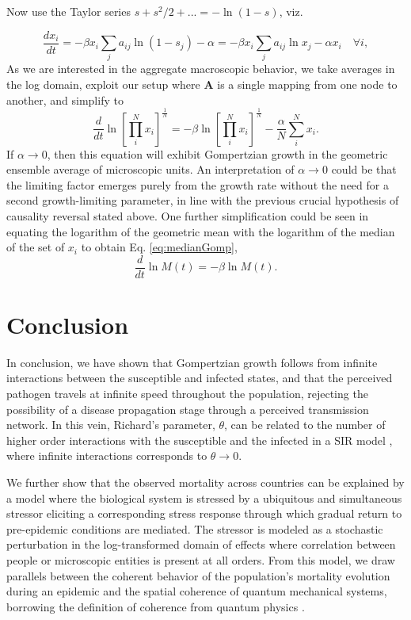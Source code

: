 \documentclass[review]{elsarticle}
\begin{document}
Now use the Taylor series $s+s^2/2+... = -\ln(1-s)$, viz.

\begin{equation}
\frac{d x_i}{dt} = -\beta x_i\sum_j{a_{ij}}\ln{(1 - s_j)} - \alpha = -\beta x_i\sum_j{a_{ij}}\ln{x_j} - \alpha x_i \quad \forall i,
\end{equation}
As we are interested in the aggregate macroscopic behavior, we take averages in the log domain, exploit our setup where $\mathbf{A}$ is a single mapping from one node to another, and simplify to
\begin{equation}
\frac{d}{{dt}} \ln\left[\prod_i^N{x_i}\right]^{\frac{1}{N}} = -\beta\ln\left[\prod_i^N{x_i}\right]^{\frac{1}{N}} - \frac{\alpha}{N}\sum_i^N x_i.
\end{equation}
If $\alpha\rightarrow 0$, then this equation will exhibit Gompertzian growth in the geometric ensemble average of microscopic units. 
An interpretation of $\alpha\rightarrow 0$ could be that the limiting factor emerges purely from the growth rate without the need for a second growth-limiting parameter, in line with the previous crucial hypothesis of causality reversal stated above. One further simplification could be seen in equating the logarithm of the geometric mean with the logarithm of the median of the set of $x_i$ to obtain Eq. \ref{eq:medianGomp},
\begin{equation}
\frac{d}{dt}\ln{M(t)} = -\beta \ln{M(t)}.
\end{equation}



\section{Conclusion}
In conclusion, we have shown that Gompertzian growth follows from infinite interactions between the susceptible and infected states, and that the perceived pathogen travels at infinite speed throughout the population, rejecting the possibility of a disease propagation stage through a perceived transmission network. In this vein, Richard's parameter, $\theta$, can be related to the number of higher order interactions with the susceptible and the infected in a SIR model \citep{richards1959flexible}, where infinite interactions corresponds to $\theta\rightarrow 0$. 

We further show that the observed mortality across countries can be explained by a model where the biological system is stressed by a ubiquitous and simultaneous stressor eliciting a corresponding stress response through which gradual return to pre-epidemic conditions are mediated. The stressor is modeled as a stochastic perturbation in the log-transformed domain of effects where correlation between people or microscopic entities is present at all orders. From this model, we draw parallels between the coherent behavior of the population's mortality evolution during an epidemic and the spatial coherence of quantum mechanical systems, borrowing the definition of coherence from quantum physics \citep{molski2003coherent}.
\end{document}
